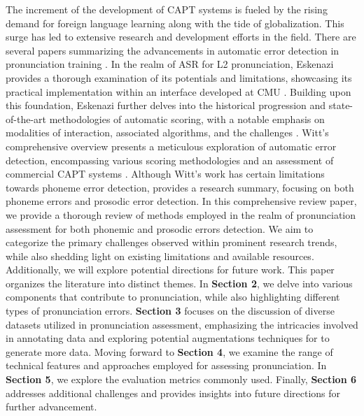 \documentclass[11pt]{article}
\begin{document}
The increment of the development of CAPT systems is fueled by the rising demand for foreign language learning along with the tide of globalization. This surge has led to extensive research and development efforts in the field. 
There are several papers summarizing the advancements in automatic error detection in pronunciation training \cite{eskenazi1999using, eskenazi2009overview, witt2012automatic, li2016mispronunciation, nancy2016}. In the realm of ASR for L2 pronunciation, Eskenazi provides a thorough examination of its potentials and limitations, showcasing its practical implementation within an interface developed at CMU \cite{eskenazi1999using}. Building upon this foundation, Eskenazi further delves into the historical progression and state-of-the-art methodologies of automatic scoring, with a notable emphasis on modalities of interaction, associated algorithms, and the challenges \cite{eskenazi2009overview}. Witt's comprehensive overview presents a meticulous exploration of automatic error detection, encompassing various scoring methodologies and an assessment of commercial CAPT systems \cite{witt2012automatic}. Although Witt's work has certain limitations towards phoneme error detection, \cite{nancy2016} provides a research summary, focusing on both phoneme errors and prosodic error detection. In this comprehensive review paper, we provide a thorough review of methods employed in the realm of pronunciation assessment for both phonemic and prosodic errors detection. We aim to categorize the primary challenges observed within prominent research trends, while also shedding light on existing limitations and available resources. Additionally, we will explore potential directions for future work. 
This paper organizes the literature into distinct themes. In \textbf{Section 2}, we delve into various components that contribute to pronunciation, while also highlighting different types of pronunciation errors. \textbf{Section 3} focuses on the discussion of diverse datasets utilized in pronunciation assessment, emphasizing the intricacies involved in annotating data and exploring potential augmentations techniques for to generate more data. Moving forward to \textbf{Section 4}, we examine the range of technical features and approaches employed for assessing pronunciation. In \textbf{Section 5}, we explore the evaluation metrics commonly used. Finally, \textbf{Section 6} addresses additional challenges and provides insights into future directions for further advancement.
\end{document}

